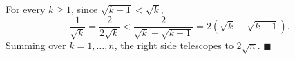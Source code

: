 For every $k\ge1$, since $\sqrt{k-1}<\sqrt k$,
\[\dfrac1{\sqrt k}=\dfrac{2}{2\sqrt k}<\dfrac{2}{\sqrt k+\sqrt{k-1}}=2\left(\sqrt k-\sqrt{k-1}\right).\]
Summing over $k=1,\dots,n$, the right side telescopes to $2\sqrt n$. $\blacksquare$
